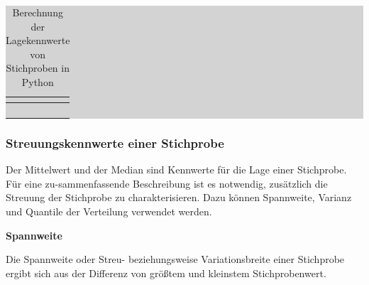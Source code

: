 \begin{table}[H]
\setlength{\arrayrulewidth}{.1em}
\caption{Berechnung der Lagekennwerte von Stichproben in Python}
\setlength{\fboxsep}{0pt}%
\colorbox{lightgray}{%
%
\begin{tabular}{| c | c |}
\hline
\parbox[c][0.3in][c]{3.3in}{\smallskip\centering\textbf{\selectfont{Lagekennwert}}} & 
\parbox[c][0.3in][c]{3.3in}{\smallskip\centering\textbf{\selectfont{MATLAB-Befehl}}}\\ \hline

\parbox[c][0.3in][c]{3.3in}{\centering{}\selectfont{Mittelwert}} & 
\parbox[c][0.3in][c]{3.3in}{\centering{}\selectfont{numpy.median}}\\ \hline

\parbox[c][0.3in][c]{3.3in}{\centering{}\selectfont{Median}} & 
\parbox[c][0.3in][c]{3.3in}{\centering{}\selectfont{numpy.mean}}\\ \hline

\parbox[c][0.3in][c]{3.3in}{\centering{}\selectfont{Geometrisches Mittel }} & 
\parbox[c][0.3in][c]{3.3in}{\centering{}\selectfont{scipy.stats.mstats.gmean}}\\ \hline

\parbox[c][0.3in][c]{3.3in}{\centering{}\selectfont{Modus}} & 
\parbox[c][0.3in][c]{3.3in}{\centering{}\selectfont{scipy.stats.mode}}\\ \hline

\end{tabular}%
}
\label{tab:threeeleven}
\end{table}

\subsubsection{Streuungskennwerte einer Stichprobe}\label{threethreetwo}

\noindent Der Mittelwert und der Median sind Kennwerte für die Lage einer Stichprobe. Für eine zu-sammenfassende Beschreibung ist es notwendig, zusätzlich die Streuung der Stichprobe zu charakterisieren. Dazu können Spannweite, Varianz und Quantile der Verteilung verwendet werden.\bigskip

{\selectfont
\noindent\textbf{Spannweite}}\smallskip

\noindent Die Spannweite oder Streu- beziehungsweise Variationsbreite einer Stichprobe ergibt sich aus der Differenz von gr\"{o}{\ss}tem und kleinstem Stichprobenwert. 

